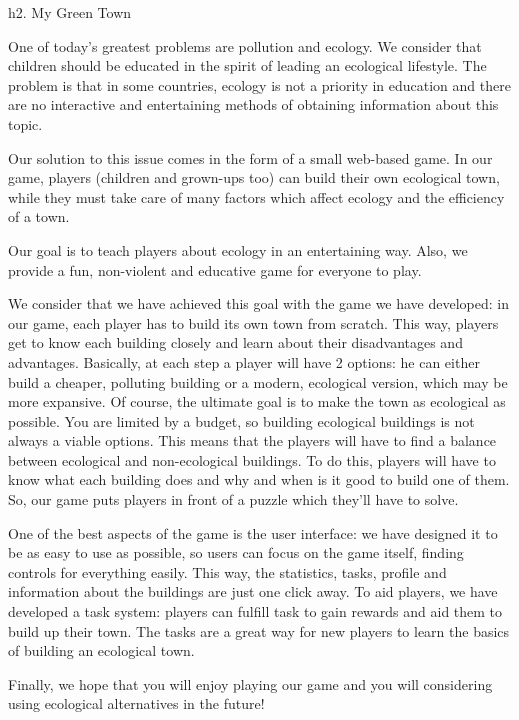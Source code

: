 h2. My Green Town

One of today's greatest problems are pollution and ecology. We consider that children should be educated in the spirit of leading an ecological lifestyle. The problem is that in some countries, ecology is not a priority in education and there are no interactive and entertaining methods of obtaining information about this topic.

Our solution to this issue comes in the form of a small web-based game. In our game, players (children and grown-ups too) can build their own ecological town, while they must take care of many factors which affect ecology and the efficiency of a town.

Our goal is to teach players about ecology in an entertaining way. Also, we provide a fun, non-violent and educative game for everyone to play.

We consider that we have achieved this goal with the game we have developed: in our game, each player has to build its own town from scratch. This way, players get to know each building closely and learn about their disadvantages and advantages. Basically, at each step a player will have 2 options: he can either build a cheaper, polluting building or a modern, ecological version, which may be more expansive. Of course, the ultimate goal is to make the town as ecological as possible. You are limited by a budget, so building ecological buildings is not always a viable options. This means that the players will have to find a balance between ecological and non-ecological buildings. To do this, players will have to know what each building does and why and when is it good to build one of them. So, our game puts players in front of a puzzle which they'll have to solve.

One of the best aspects of the game is the user interface: we have designed it to be as easy to use as possible, so users can focus on the game itself, finding controls for everything easily. This way, the statistics, tasks, profile and information about the buildings are just one click away.
To aid players, we have developed a task system: players can fulfill task to gain rewards and aid them to build up their town. The tasks are a great way for new players to learn the basics of building an ecological town.

Finally, we hope that you will enjoy playing our game and you will considering using ecological alternatives in the future!